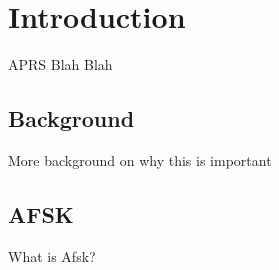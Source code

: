 \chapter{Introduction}

APRS Blah Blah

\section{Background}

More background on why this is important

\section{AFSK}

What is Afsk?